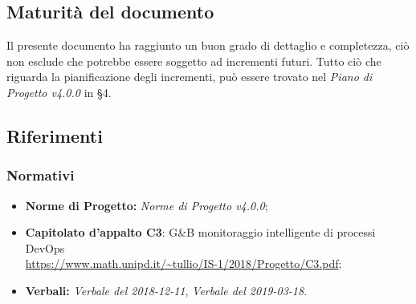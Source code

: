\subsection{Maturità del documento}
Il presente documento ha raggiunto un buon grado di dettaglio e completezza, ciò non esclude che potrebbe essere soggetto ad incrementi futuri. Tutto ciò che riguarda la pianificazione degli incrementi, può essere trovato nel \emph{Piano di Progetto v4.0.0} in §4.
\subsection{Riferimenti}

\subsubsection{Normativi}
\begin{itemize}
	\item \textbf{Norme di Progetto:} \emph{Norme di Progetto v4.0.0};
	\item \textbf{Capitolato d'appalto C3}: G\&B monitoraggio intelligente di processi DevOps \\
	\url{https://www.math.unipd.it/~tullio/IS-1/2018/Progetto/C3.pdf};
	\item \textbf{Verbali:} \emph{Verbale del 2018-12-11}, \emph{Verbale del 2019-03-18}.

\end{itemize}
